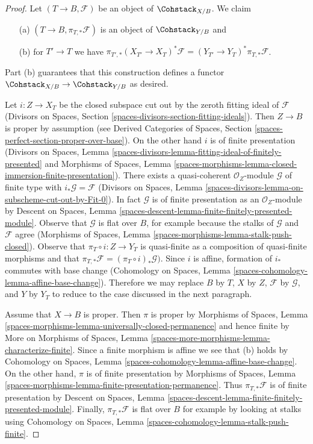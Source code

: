 \begin{proof}
Let $(T \to B, \mathcal{F})$ be an object of $\Cohstack_{X/B}$.
We claim
\begin{enumerate}
\item[(a)] $(T \to B, \pi_{T, *}\mathcal{F})$ is an object
of $\Cohstack_{Y/B}$ and
\item[(b)] for $T' \to T$ we have
$\pi_{T', *}(X_{T'} \to X_T)^*\mathcal{F} =
(Y_{T'} \to Y_T)^*\pi_{T, *}\mathcal{F}$.
\end{enumerate}
Part (b) guarantees that this construction defines a functor
$\Cohstack_{X/B} \to \Cohstack_{Y/B}$ as desired.

\medskip\noindent
Let $i : Z \to X_T$ be the closed subspace cut out by the zeroth
fitting ideal of $\mathcal{F}$
(Divisors on Spaces, Section
\ref{spaces-divisors-section-fitting-ideals}).
Then $Z \to B$ is proper by assumption (see
Derived Categories of Spaces, Section
\ref{spaces-perfect-section-proper-over-base}).
On the other hand $i$ is of finite presentation
(Divisors on Spaces, Lemma
\ref{spaces-divisors-lemma-fitting-ideal-of-finitely-presented} and
Morphisms of Spaces, Lemma
\ref{spaces-morphisms-lemma-closed-immersion-finite-presentation}).
There exists a quasi-coherent $\mathcal{O}_Z$-module
$\mathcal{G}$ of finite type with $i_*\mathcal{G} = \mathcal{F}$
(Divisors on Spaces, Lemma
\ref{spaces-divisors-lemma-on-subscheme-cut-out-by-Fit-0}).
In fact $\mathcal{G}$ is of finite presentation as an $\mathcal{O}_Z$-module
by Descent on Spaces, Lemma
\ref{spaces-descent-lemma-finite-finitely-presented-module}.
Observe that $\mathcal{G}$ is flat over $B$, for example
because the stalks of $\mathcal{G}$ and $\mathcal{F}$ agree
(Morphisms of Spaces, Lemma \ref{spaces-morphisms-lemma-stalk-push-closed}).
Observe that $\pi_T \circ i : Z \to Y_T$ is quasi-finite as a composition
of quasi-finite morphisms and that
$\pi_{T, *}\mathcal{F} = (\pi_T \circ i)_*\mathcal{G})$.
Since $i$ is affine, formation of $i_*$ commutes with base change
(Cohomology on Spaces, Lemma \ref{spaces-cohomology-lemma-affine-base-change}).
Therefore we may replace $B$ by $T$, $X$ by $Z$,
$\mathcal{F}$ by $\mathcal{G}$, and $Y$ by $Y_T$
to reduce to the case discussed in the next paragraph.

\medskip\noindent
Assume that $X \to B$ is proper. Then $\pi$ is proper
by Morphisms of Spaces, Lemma
\ref{spaces-morphisms-lemma-universally-closed-permanence}
and hence finite by
More on Morphisms of Spaces,
Lemma \ref{spaces-more-morphisms-lemma-characterize-finite}.
Since a finite morphism is affine we see that (b) holds by
Cohomology on Spaces, Lemma \ref{spaces-cohomology-lemma-affine-base-change}.
On the other hand, $\pi$ is of finite presentation by
Morphisms of Spaces, Lemma
\ref{spaces-morphisms-lemma-finite-presentation-permanence}.
Thus $\pi_{T, *}\mathcal{F}$ is of finite presentation by
Descent on Spaces, Lemma
\ref{spaces-descent-lemma-finite-finitely-presented-module}.
Finally, $\pi_{T, *}\mathcal{F} $ is flat over $B$ for example
by looking at stalks using
Cohomology on Spaces, Lemma \ref{spaces-cohomology-lemma-stalk-push-finite}.
\end{proof}

